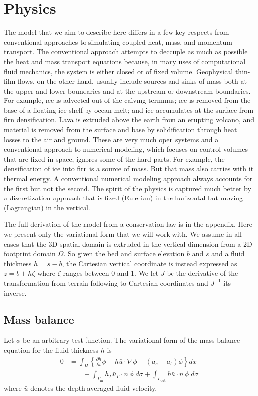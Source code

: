 \documentclass{article}
\theoremstyle{definition}
\theoremstyle{plain}
\begin{document}
\section{Physics}

The model that we aim to describe here differs in a few key respects from conventional approaches to simulating coupled heat, mass, and momentum transport.
The conventional approach attempts to decouple as much as possible the heat and mass transport equations because, in many uses of computational fluid mechanics, the system is either closed or of fixed volume.
Geophysical thin-film flows, on the other hand, usually include sources and sinks of mass both at the upper and lower boundaries and at the upstream or downstream boundaries.
For example, ice is advected out of the calving terminus; ice is removed from the base of a floating ice shelf by ocean melt; and ice accumulates at the surface from firn densification.
Lava is extruded above the earth from an erupting volcano, and material is removed from the surface and base by solidification through heat losses to the air and ground.
These are very much open systems and a conventional approach to numerical modeling, which focuses on control volumes that are fixed in space, ignores some of the hard parts.
For example, the densification of ice into firn is a source of mass.
But that mass also carries with it thermal energy.
A conventional numerical modeling approach always accounts for the first but not the second.
The spirit of the physics is captured much better by a discretization approach that is fixed (Eulerian) in the horizontal but moving (Lagrangian) in the vertical.

The full derivation of the model from a conservation law is in the appendix.
Here we present only the variational form that we will work with.
We assume in all cases that the 3D spatial domain is extruded in the vertical dimension from a 2D footprint domain $\Omega$.
So given the bed and surface elevation $b$ and $s$ and a fluid thickness $h = s - b$, the Cartesian vertical coordinate is instead expressed as $z = b + h\zeta$ where $\zeta$ ranges between 0 and 1.
We let $J$ be the derivative of the transformation from terrain-following to Cartesian coordinates and $J^{-1}$ its inverse.

\subsection{Mass balance}

Let $\phi$ be an arbitrary test function.
The variational form of the mass balance equation for the fluid thickness $h$ is
\begin{align}
    0 & = \int_\Omega\left\{\frac{\partial h}{\partial t}\phi - h\bar u\cdot\nabla\phi - (\dot a_s - \dot a_b)\phi\right\}dx \nonumber\\
    & \qquad + \int_{\Gamma_{\text{in}}}h_\Gamma \bar u_\Gamma\cdot n\,\phi\;d\sigma + \int_{\Gamma_{\text{out}}}h\bar u\cdot n\,\phi\;d\sigma
\end{align}
where $\bar u$ denotes the depth-averaged fluid velocity.
\end{document}
